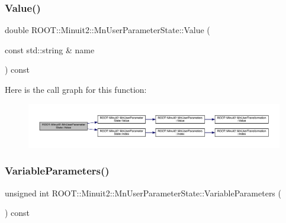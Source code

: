 \mbox{\label{classROOT_1_1Minuit2_1_1MnUserParameterState_a02135107320f1ce5680fe25cf406f08f}} 
\subsubsection{\texorpdfstring{Value()}{Value()}\hspace{0.1cm}{\footnotesize\ttfamily [4/4]}}
{\footnotesize\ttfamily double R\+O\+O\+T\+::\+Minuit2\+::\+Mn\+User\+Parameter\+State\+::\+Value (\begin{DoxyParamCaption}\item[{const std\+::string \&}]{name }\end{DoxyParamCaption}) const}

Here is the call graph for this function\+:\nopagebreak
\begin{figure}[H]
\begin{center}
\leavevmode
\includegraphics[width=350pt]{d3/de0/classROOT_1_1Minuit2_1_1MnUserParameterState_a02135107320f1ce5680fe25cf406f08f_cgraph}
\end{center}
\end{figure}
\mbox{\label{classROOT_1_1Minuit2_1_1MnUserParameterState_a8226cef71821d2558f31570f002631a4}} 
\subsubsection{\texorpdfstring{VariableParameters()}{VariableParameters()}\hspace{0.1cm}{\footnotesize\ttfamily [1/2]}}
{\footnotesize\ttfamily unsigned int R\+O\+O\+T\+::\+Minuit2\+::\+Mn\+User\+Parameter\+State\+::\+Variable\+Parameters (\begin{DoxyParamCaption}{ }\end{DoxyParamCaption}) const}

